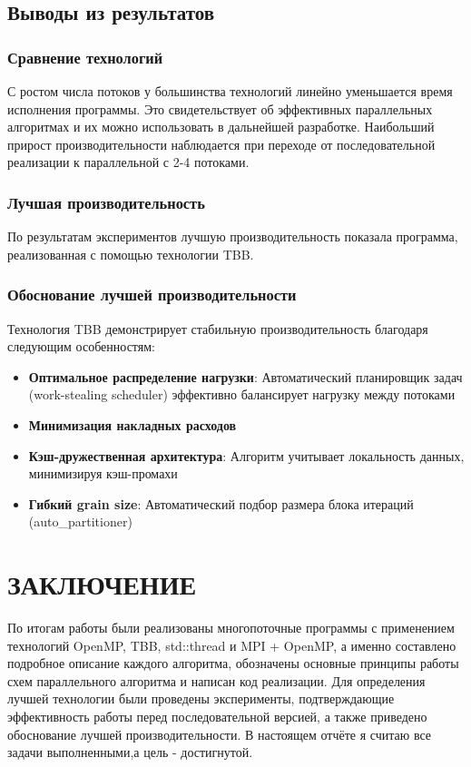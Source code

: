 \documentclass[14pt,a4paper]{article}
\begin{document}
\subsection{Выводы из результатов}
\subsubsection{Сравнение технологий}
С ростом числа потоков у большинства технологий линейно уменьшается время исполнения программы. Это свидетельствует об эффективных параллельных алгоритмах и их можно использовать в дальнейшей разработке. Наибольший прирост производительности наблюдается при переходе от последовательной реализации к параллельной с 2-4 потоками.

\subsubsection{Лучшая производительность}
По результатам экспериментов лучшую производительность показала программа, реализованная с помощью технологии TBB.

\subsubsection{Обоснование лучшей производительности}
Технология TBB демонстрирует стабильную производительность благодаря следующим особенностям:
\begin{itemize}
\item \textbf{Оптимальное распределение нагрузки}: Автоматический планировщик задач (work-stealing scheduler) эффективно балансирует нагрузку между потоками
\item \textbf{Минимизация накладных расходов}
\item \textbf{Кэш-дружественная архитектура}: Алгоритм учитывает локальность данных, минимизируя кэш-промахи
\item \textbf{Гибкий grain size}: Автоматический подбор размера блока итераций (auto\_partitioner)
\end{itemize}
\newpage

\section{ЗАКЛЮЧЕНИЕ}
По итогам работы были реализованы многопоточные программы с применением технологий
OpenMP, TBB, std::thread и MPI + OpenMP, а именно составлено подробное описание каждого алгоритма, обозначены основные принципы работы схем параллельного алгоритма и написан код реализации. Для определения лучшей технологии были проведены эксперименты, подтверждающие эффективность работы перед последовательной версией, а также приведено обоснование лучшей производительности. В настоящем отчёте я считаю все задачи выполненными,а цель - достигнутой. 
\end{document}
